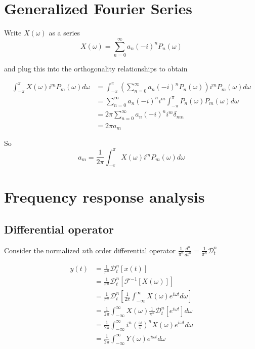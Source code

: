 \documentclass[11pt]{article}
\theoremstyle{plain}
\theoremstyle{definition}
\theoremstyle{remark}
\begin{document}
\section{Generalized Fourier Series}

Write $X(\omega)$ as a series
\begin{equation*}
	X(\omega) = \sum_{n=0}^{\infty} a_n (-i)^n P_n(\omega)
\end{equation*}

and plug this into the orthogonality relationships to obtain

\begin{align*}
	\int_{-\pi}^{\pi} X(\omega) i^m P_m(\omega) d\omega 
		&= \int_{-\pi}^{\pi} \left ( \sum_{n=0}^{\infty} a_n (-i)^n P_n(\omega) \right ) i^m P_m(\omega) d\omega \\
		&= \sum_{n=0}^{\infty} a_n (-i)^n  i^m \int_{-\pi}^{\pi} P_n(\omega) P_m(\omega) d\omega \\
		&= 2 \pi \sum_{n=0}^{\infty} a_n (-i)^n  i^m \delta_{mn} \\
		&= 2 \pi a_m
\end{align*}

So
\begin{equation*}
	a_m = \frac{1}{2\pi} \int_{-\pi}^{\pi} X(\omega) i^m P_m(\omega) d\omega 
\end{equation*}

\section{Frequency response analysis}

\subsection{Differential operator}

Consider the normalized $n$th order differential operator $\frac{1}{\pi^n} \frac{d^n}{dt^n} = 
\frac{1}{\pi^n} \mathcal{D}_t^n$

\begin{align*}
	y(t) &= \frac{1}{\pi^n} \mathcal{D}_t^n[x(t)] \\
			 &= \frac{1}{\pi^n} \mathcal{D}_t^n[\mathcal{F}^{-1}[X(\omega)]] \\
			 &= \frac{1}{\pi^n} \mathcal{D}_t^n \left [ \frac{1}{2 \pi} \int_{-\infty}^{\infty} X(\omega) e^{i \omega t} d\omega \right ] \\
			 &= \frac{1}{2 \pi} \int_{-\infty}^{\infty} X(\omega) \frac{1}{\pi^n} \mathcal{D}_t^n[e^{i \omega t}] d\omega \\
			 &= \frac{1}{2 \pi} \int_{-\infty}^{\infty} i^n \left(\frac{\omega}{\pi}\right)^n X(\omega) e^{i\omega t} d\omega \\
			 &= \frac{1}{2 \pi} \int_{-\infty}^{\infty} Y(\omega) e^{i\omega t} d\omega
\end{align*}
\end{document}
